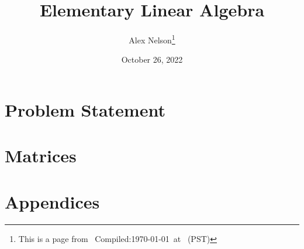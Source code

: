 \documentclass{article}
\title{Elementary Linear Algebra}
\author{Alex Nelson\thanks{This is a page from \homeurl{}\hfil\break\indent\;\, Compiled:\enspace\today\ at \currenttime\ (PST)}}
\date{October 26, 2022}
\begin{document}
\maketitle
\tableofcontents

\part{Problem Statement}

\part{Matrices}





\vfill\eject
\part{Appendices}
\appendix



\end{document}
